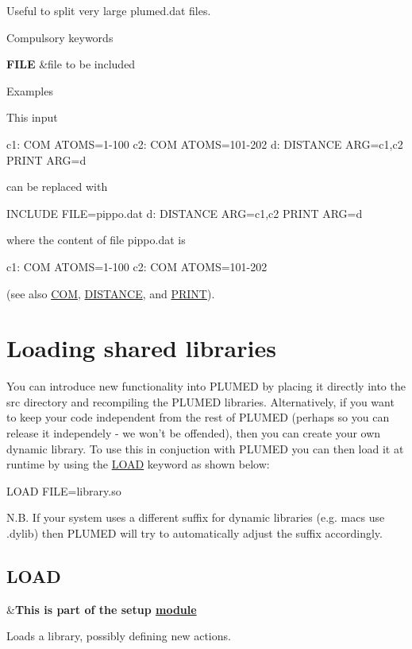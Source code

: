 Useful to split very large plumed.\+dat files.

\begin{DoxyParagraph}{Compulsory keywords}

\end{DoxyParagraph}
\begin{TabularC}{2}
\hline
{\bfseries  F\+I\+L\+E } &file to be included   \\
\end{TabularC}


\begin{DoxyParagraph}{Examples}

\end{DoxyParagraph}
This input \begin{DoxyVerb}c1: COM ATOMS=1-100
c2: COM ATOMS=101-202
d: DISTANCE ARG=c1,c2
PRINT ARG=d
\end{DoxyVerb}


can be replaced with \begin{DoxyVerb}INCLUDE FILE=pippo.dat
d: DISTANCE ARG=c1,c2
PRINT ARG=d
\end{DoxyVerb}


where the content of file pippo.\+dat is \begin{DoxyVerb}c1: COM ATOMS=1-100
c2: COM ATOMS=101-202
\end{DoxyVerb}


(see also \hyperlink{COM}{C\+O\+M}, \hyperlink{DISTANCE}{D\+I\+S\+T\+A\+N\+C\+E}, and \hyperlink{PRINT}{P\+R\+I\+N\+T}). \hypertarget{load}{}\section{Loading shared libraries}\label{load}
You can introduce new functionality into P\+L\+U\+M\+E\+D by placing it directly into the src directory and recompiling the P\+L\+U\+M\+E\+D libraries. Alternatively, if you want to keep your code independent from the rest of P\+L\+U\+M\+E\+D (perhaps so you can release it independely -\/ we won't be offended), then you can create your own dynamic library. To use this in conjuction with P\+L\+U\+M\+E\+D you can then load it at runtime by using the \hyperlink{LOAD}{L\+O\+A\+D} keyword as shown below\+:

\begin{DoxyVerb}LOAD FILE=library.so
\end{DoxyVerb}


N.\+B. If your system uses a different suffix for dynamic libraries (e.\+g. macs use .dylib) then P\+L\+U\+M\+E\+D will try to automatically adjust the suffix accordingly. \hypertarget{LOAD}{}\subsection{L\+O\+A\+D}\label{LOAD}
\begin{TabularC}{2}
\hline
&{\bfseries  This is part of the setup \hyperlink{mymodules}{module }}   \\
\end{TabularC}
Loads a library, possibly defining new actions.

